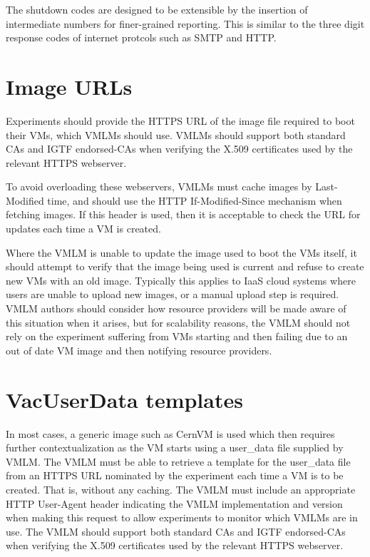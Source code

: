 \documentclass[12pt,a4paper]{article}
\begin{document}
The shutdown codes are designed to be extensible by the insertion of 
intermediate numbers for finer-grained reporting. This is similar to the
three digit response codes of internet protcols such as SMTP and HTTP.

\section{Image URLs}
\label{sec:imageurls}

Experiments should provide the HTTPS URL of the image file required to boot
their VMs, which VMLMs should use. VMLMs should support both standard CAs
and IGTF endorsed-CAs when verifying the X.509 certificates used by the
relevant HTTPS webserver.

To avoid overloading these webservers, VMLMs must cache images by 
Last-Modified time, and should use the HTTP If-Modified-Since mechanism
when fetching images. If this header is used, then it is acceptable to
check the URL for updates each time a VM is created.

Where the VMLM is unable to update the image used to boot the VMs itself, 
it should attempt to verify that the image being used is current and refuse
to create new VMs with an old image. Typically this applies to IaaS cloud
systems where users are unable to upload new images, or a manual upload step
is required. VMLM authors should consider how resource providers will be
made aware of this situation when it arises, but for scalability reasons,
the VMLM should not rely on the experiment suffering from VMs starting and
then failing 
due to an out of date VM image and then notifying resource providers.

\section{VacUserData templates}
\label{sec:vacuserdata}

In most cases, a generic image such as CernVM is used which then
requires further contextualization as the VM starts using a user\_data
file supplied by VMLM. The VMLM must be able to retrieve a template for
the user\_data file
from an HTTPS URL nominated by the experiment each time a VM is to 
be created. That is, without any caching. The VMLM must include an
appropriate HTTP User-Agent header indicating the VMLM implementation
and version when making this request to allow experiments to monitor
which VMLMs are in use. The VMLM should support both standard CAs
and IGTF endorsed-CAs when verifying the X.509 certificates used by the
relevant HTTPS webserver.
\end{document}

